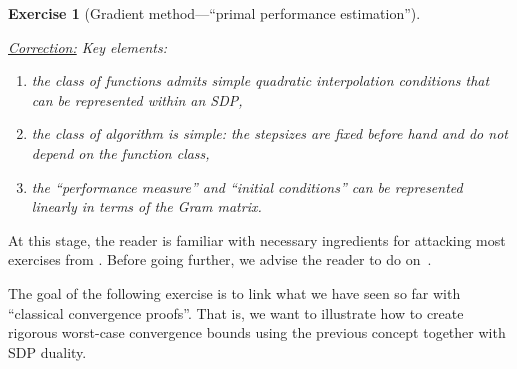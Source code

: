 \documentclass[11pt,a4paper]{article}
\newcommand{\correction}[1]{{{\color{blue}\underline{Correction:} #1}}}
\newcommand{\correction}[1]{}
\newtheorem{exercise}{Exercise}
\begin{document}
\begin{exercise}[Gradient method---``primal performance estimation'']
\begin{enumerate}
	\correction{ Key elements:
	\begin{enumerate}
	\item the class of functions admits simple quadratic interpolation conditions that can be represented within an SDP,
	\item the class of algorithm is simple: the stepsizes are fixed before hand and do not depend on the function class,
	\item the ``performance measure'' and ``initial conditions'' can be represented linearly in terms of the Gram matrix.
	\end{enumerate}
	
	}
	\end{enumerate}
	\end{exercise}

At this stage, the reader is familiar with necessary ingredients for attacking most exercises from . Before going further, we advise the reader to do on~.

The goal of the following exercise is to link what we have seen so far with ``classical convergence proofs''. That is, we want to illustrate how to create rigorous worst-case convergence bounds using the previous concept together with SDP duality.
\end{document}
